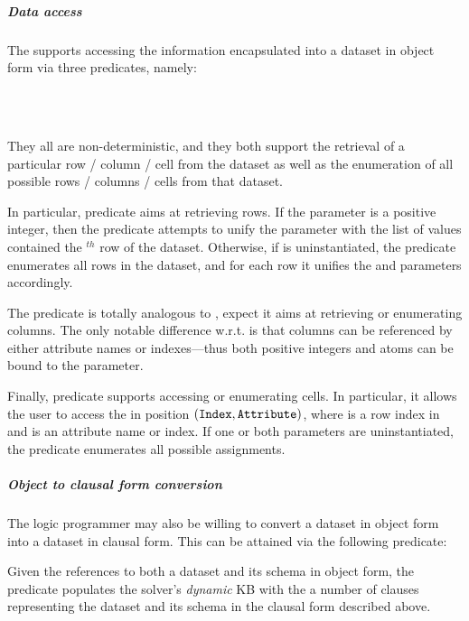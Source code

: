 \documentclass[12pt,a4paper,openright,twoside]{book}
\begin{document}
\subparagraph{Data access}

The \mllib{} supports accessing the information encapsulated into a dataset in object form via three predicates, namely:
%
\begin{center}
    \\
    \\
\end{center}
%
They all are non-deterministic, and they both support the retrieval of a particular row / column / cell from the dataset as well as the enumeration of all possible rows / columns / cells from that dataset.

In particular, predicate  aims at retrieving rows.
%
If the  parameter is a positive integer, then the predicate attempts to unify the  parameter with the list of values contained the $^{th}$ row of the dataset.
%
Otherwise, if  is uninstantiated, the predicate enumerates all rows in the dataset, and for each row it unifies the  and  parameters accordingly.

The predicate  is totally analogous to , expect it aims at retrieving or enumerating columns.
%
The only notable difference w.r.t.  is that columns can be referenced by either attribute names or indexes---thus both positive integers and atoms can be bound to the  parameter.

Finally, predicate  supports accessing or enumerating cells.
%
In particular, it allows the user to access the  in position $(\texttt{Index}, \texttt{Attribute})$, where  is a row index in and  is an attribute name or index.
%
If one or both parameters are uninstantiated, the predicate enumerates all possible assignments.

\subparagraph{Object to clausal form conversion}

The logic programmer may also be willing to convert a dataset in object form into a dataset in clausal form.
%
This can be attained via the following predicate:
%
\begin{center}
\end{center}
%
Given the references to both a dataset and its schema in object form, the predicate populates the solver's \emph{dynamic} KB with the a number of clauses representing the dataset and its schema in the clausal form described above.
\end{document}
